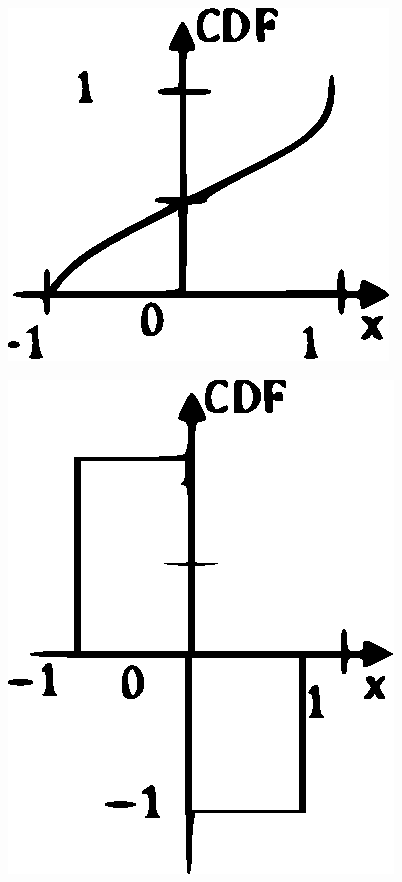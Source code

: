 \documentclass[journal,12pt,twocolumn]{IEEEtran}
\begin{document}
\begin{enumerate}
\begin{figure}[!h]
\caption{}
\label{fig:4}
\end{figure}
\begin{figure}[!h]
\includegraphics[width=\columnwidth]{./figs/figure5.eps}
\caption{}
\label{fig:5}
\end{figure}

\begin{figure}[!h]
\includegraphics[width=\columnwidth]{./figs/figure6.eps}
\caption{}
\label{fig:6}
\end{figure}




\end{enumerate}
\end{document}
